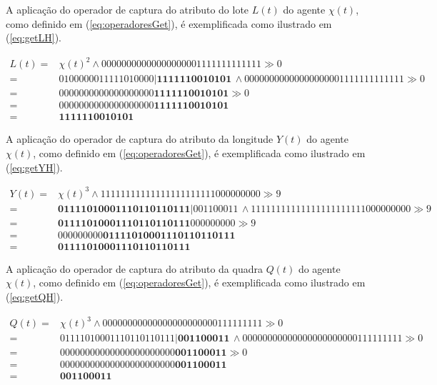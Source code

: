 A aplicação do operador de captura do atributo do lote $L(t)$ do agente $\chi(t)$, como definido em (\ref{eq:operadoresGet}), é exemplificada como ilustrado em (\ref{eq:getLH}).

\begin{equation}
 \begin{split}
 L(t) = & \chi(t)^2 \wedge 00000000000000000001111111111111 \gg 0 \\
      = & 0 1 0 0 0 0 0 0 1 1 1 1 1 0 1 0 0 0 0 | \boldsymbol{1 1 1 1 1 1 0 0 1 0 1 0 1} \, \wedge 00000000000000000001111111111111 \gg 0 \\
      = & 0 0 0 0 0 0 0 0 0 0 0 0 0 0 0 0 0 0 0 \boldsymbol{1 1 1 1 1 1 0 0 1 0 1 0 1} \gg 0 \\
      = & 0 0 0 0 0 0 0 0 0 0 0 0 0 0 0 0 0 0 0 \boldsymbol{1 1 1 1 1 1 0 0 1 0 1 0 1} \\
      = & \boldsymbol{1 1 1 1 1 1 0 0 1 0 1 0 1}
 \label{eq:getLH}
 \end{split}
\end{equation}

A aplicação do operador de captura do atributo da longitude $Y(t)$ do agente $\chi(t)$, como definido em (\ref{eq:operadoresGet}), é exemplificada como ilustrado em (\ref{eq:getYH}).

\begin{equation}
 \begin{split}
 Y(t) = & \chi(t)^3 \wedge 11111111111111111111111000000000 \gg 9 \\
      = & \boldsymbol{0 1 1 1 1 0 1 0 0 0 1 1 1 0 1 1 0 1 1 0 1 1 1} | 0 0 1 1 0 0 0 1 1 \, \wedge 11111111111111111111111000000000 \gg 9 \\
      = & \boldsymbol{0 1 1 1 1 0 1 0 0 0 1 1 1 0 1 1 0 1 1 0 1 1 1} 0 0 0 0 0 0 0 0 0 \gg 9 \\
      = & 0 0 0 0 0 0 0 0 0 \boldsymbol{0 1 1 1 1 0 1 0 0 0 1 1 1 0 1 1 0 1 1 0 1 1 1} \\
      = & \boldsymbol{0 1 1 1 1 0 1 0 0 0 1 1 1 0 1 1 0 1 1 0 1 1 1}
 \label{eq:getYH}
 \end{split}
\end{equation}

A aplicação do operador de captura do atributo da quadra $Q(t)$ do agente $\chi(t)$, como definido em (\ref{eq:operadoresGet}), é exemplificada como ilustrado em (\ref{eq:getQH}).

\begin{equation}
 \begin{split}
 Q(t) = & \chi(t)^3 \wedge 00000000000000000000000111111111 \gg 0 \\
      = & 0 1 1 1 1 0 1 0 0 0 1 1 1 0 1 1 0 1 1 0 1 1 1 | \boldsymbol{0 0 1 1 0 0 0 1 1} \, \wedge 00000000000000000000000111111111 \gg 0 \\
      = & 0 0 0 0 0 0 0 0 0 0 0 0 0 0 0 0 0 0 0 0 0 0 0 \boldsymbol{0 0 1 1 0 0 0 1 1} \gg 0 \\
      = & 0 0 0 0 0 0 0 0 0 0 0 0 0 0 0 0 0 0 0 0 0 0 0 \boldsymbol{0 0 1 1 0 0 0 1 1} \\
      = & \boldsymbol{0 0 1 1 0 0 0 1 1}
 \label{eq:getQH}
 \end{split}
\end{equation}

